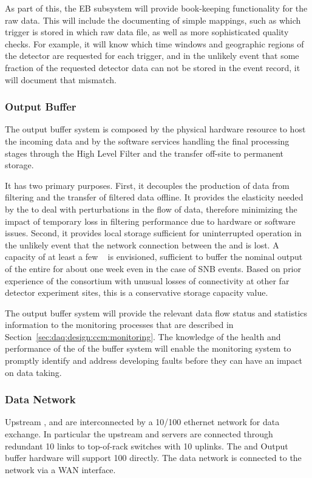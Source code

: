 As part of this, the EB subsystem will provide book-keeping functionality for the raw data.  This will include the documenting of simple mappings, such as which trigger is stored in which raw data file, as well as more sophisticated quality checks. For example, it will know which time windows and geographic regions of the detector are requested for each trigger, and in the unlikely event that some fraction of the requested detector data can not be stored in the event record, it will document that mismatch.

\subsubsection{Output Buffer}

The output buffer system is composed by the physical hardware resource
to host the incoming data and by the software services handling the
final processing stages through the High Level Filter and the transfer off-site to permanent storage.

It has two primary purposes.  First, it decouples the production of data from filtering and the
transfer of filtered data offline. It provides the elasticity needed by the  to deal with
perturbations in the flow of data, therefore minimizing the impact of temporary loss in filtering
performance due to hardware or software issues. Second, it provides local storage sufficient for
uninterrupted  operation in the unlikely event that the network connection between the
 and \fnal is lost.  A capacity of at least a few \si{\peta\byte} is envisioned,
sufficient to buffer the nominal output of the entire  for about one week even in the case of SNB events. Based on prior experience of the consortium with unusual losses of  connectivity at
other far detector experiment sites, this is a conservative storage capacity value.

The output buffer system will provide the relevant data flow status and statistics information to the monitoring processes that are described in Section~\ref{sec:daq:design:ccm:monitoring}. The knowledge of the health and performance of the of the buffer system will enable the monitoring system to promptly identify and address developing faults before they can have an impact on data taking.


\subsubsection{Data Network}
Upstream ,  and   are interconnected by a \SI{10/100}{\Gbps} ethernet network for data exchange.
In particular the upstream  and  servers are connected through redundant \SI{10}{\Gbps} links to top-of-rack switches with \SI{10}{\Gbps} uplinks.
The  and Output buffer hardware will support \SI{100}{\Gbps} directly.
The  data network is connected to the \fnal network via a WAN interface.

